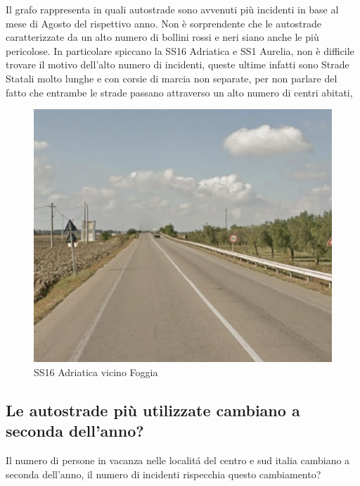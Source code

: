 \documentclass[a4paper]{report}
\begin{document}
Il grafo rappresenta in quali autostrade sono avvenuti più incidenti in base al mese di Agosto
del rispettivo anno.
Non è sorprendente che le autostrade caratterizzate da un alto numero di bollini rossi e neri 
siano anche le più pericolose.
In particolare spiccano la SS16 Adriatica e SS1 Aurelia, non è difficile trovare il motivo dell'alto numero di incidenti, 
queste ultime infatti sono Strade Statali molto lunghe e con corsie di marcia non separate, 
per non parlare del fatto che entrambe le strade passano attraverso un alto numero di centri abitati, 

\begin{figure}
    \includegraphics[width=\linewidth]{../src/incidenti/incidenti_aci/agosto/adriatica.png}
    \caption{SS16 Adriatica vicino Foggia}
    \label{fig:adriatica}
\end{figure}

\subsection{Le autostrade più utilizzate cambiano a seconda dell'anno?}

Il numero di persone in vacanza nelle localit\'a del centro e sud italia cambiano 
a seconda dell'anno, il numero di incidenti rispecchia questo cambiamento?
\end{document}
